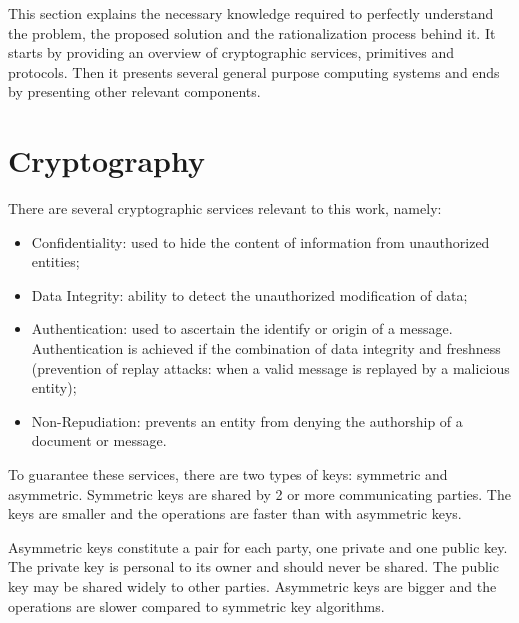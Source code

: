 \cleardoublepage
\label{chap:background}

This section explains the necessary knowledge required to perfectly understand the problem, the proposed solution and the rationalization process behind it. It starts by providing an overview of cryptographic services, primitives and protocols. Then it presents several general purpose computing systems and ends by presenting other relevant components.

\section{Cryptography}  \label{crypto}

There are several cryptographic services relevant to this work, namely:
\begin{itemize}
    \item Confidentiality: used to hide the content of information from unauthorized entities;
    
    \item Data Integrity: ability to detect the unauthorized modification of data;
    
    \item Authentication: used to ascertain the identify or origin of a message. Authentication is achieved if the combination of data integrity and freshness (prevention of replay attacks: when a valid message is replayed by a malicious entity);
    
    \item Non-Repudiation: prevents an entity from denying the authorship of a document or message.
\end{itemize}

To  guarantee these services, there are two types of keys: symmetric and asymmetric.
Symmetric keys are shared by 2 or more communicating parties. The keys are smaller and the operations are faster than with asymmetric keys.

Asymmetric keys constitute a pair for each party, one private and one public key. The private key is personal to its owner and should never be shared. The public key may be shared widely to other parties. Asymmetric keys are bigger and the operations are slower compared to symmetric key algorithms.

